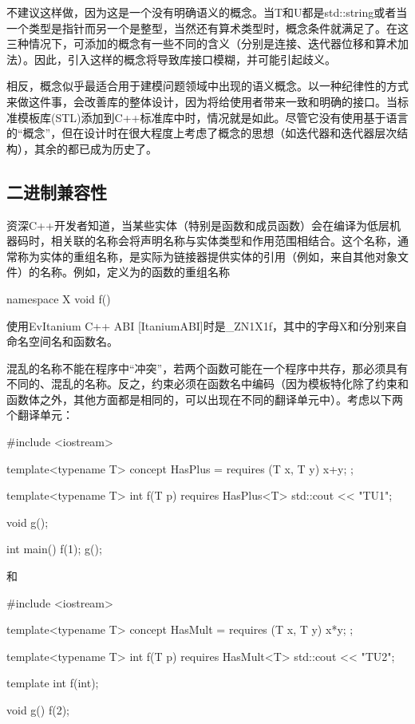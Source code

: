 不建议这样做，因为这是一个没有明确语义的概念。当T和U都是std::string或者当一个类型是指针而另一个是整型，当然还有算术类型时，概念条件就满足了。在这三种情况下，可添加的概念有一些不同的含义（分别是连接、迭代器位移和算术加法）。因此，引入这样的概念将导致库接口模糊，并可能引起歧义。

相反，概念似乎最适合用于建模问题领域中出现的语义概念。以一种纪律性的方式来做这件事，会改善库的整体设计，因为将给使用者带来一致和明确的接口。当标准模板库(STL)添加到C++标准库中时，情况就是如此。尽管它没有使用基于语言的“概念”，但在设计时在很大程度上考虑了概念的思想（如迭代器和迭代器层次结构），其余的都已成为历史了。

\subsection{二进制兼容性}

资深C++开发者知道，当某些实体（特别是函数和成员函数）会在编译为低层机器码时，相关联的名称会将声明名称与实体类型和作用范围相结合。这个名称，通常称为实体的重组名称，是实际为链接器提供实体的引用（例如，来自其他对象文件）的名称。例如，定义为的函数的重组名称

\begin{cpp}
namespace X {
	void f() {}
}
\end{cpp}

使用EvItanium C++ ABI [ItaniumABI]时是\_ZN1X1f，其中的字母X和f分别来自命名空间名和函数名。

混乱的名称不能在程序中“冲突”，若两个函数可能在一个程序中共存，那必须具有不同的、混乱的名称。反之，约束必须在函数名中编码（因为模板特化除了约束和函数体之外，其他方面都是相同的，可以出现在不同的翻译单元中）。考虑以下两个翻译单元：

\begin{cpp}
#include <iostream>

template<typename T>
concept HasPlus = requires (T x, T y) {
	x+y;
};

template<typename T> int f(T p) requires HasPlus<T> {
	std::cout << "TU1\n";
}

void g();

int main() {
	f(1);
	g();
}
\end{cpp}

和

\begin{cpp}
#include <iostream>

template<typename T>
concept HasMult = requires (T x, T y) {
	x*y;
};

template<typename T> int f(T p) requires HasMult<T> {
	std::cout << "TU2\n";
}

template int f(int);

void g() {
	f(2);
}
\end{cpp}

